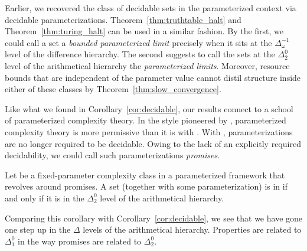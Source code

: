 Earlier, we recovered the class of decidable sets in the parameterized context via decidable parameterizations.
Theorem~\ref{thm:truthtable_halt} and Theorem~\ref{thm:turing_halt} can be used in a similar fashion.
By the first, we could call a set a \emph{bounded parameterized limit} precisely when it sits at the $\Delta^{-1}_\omega$ level of the difference hierarchy.
The second suggests to call the sets at the $\Delta^0_2$ level of the arithmetical hierarchy the \emph{parameterized limits}.
Moreover, resource bounds that are independent of the parameter value cannot distil structure inside either of these classes by Theorem~\ref{thm:slow_convergence}.

Like what we found in Corollary~\ref{cor:decidable}, our results connect to a school of parameterized complexity theory.
In the style pioneered by \textcite{downey1999parameterized}, parameterized complexity theory is more permissive than it is with \textcite{flum2006parameterized}.
With \citeauthor{downey1999parameterized}, parameterizations are no longer required to be decidable.
Owing to the lack of an explicitly required decidability, we could call such parameterizations \emph{promises}.
\begin{corollary}
  Let  be a fixed-parameter complexity class in a parameterized framework that revolves around promises.
  A set (together with some parameterization) is in  if and only if it is in the $\Delta^0_2$ level of the arithmetical hierarchy.
\end{corollary}

Comparing this corollary with Corollary~\ref{cor:decidable}, we see that we have gone one step up in the $\Delta$ levels of the arithmetical hierarchy.
Properties are related to $\Delta^0_1$ in the way promises are related to $\Delta^0_2$.

